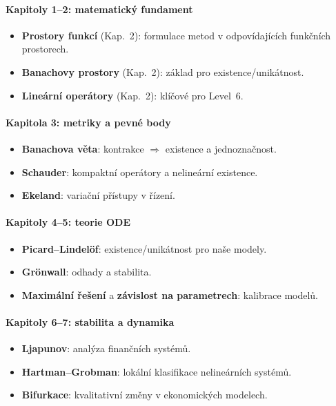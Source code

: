 \paragraph{Kapitoly 1--2: matematický fundament}
\begin{itemize}
  \item \textbf{Prostory funkcí} (Kap.~2): formulace metod v odpovídajících funkčních prostorech.
  \item \textbf{Banachovy prostory} (Kap.~2): základ pro existence/unikátnost.
  \item \textbf{Lineární operátory} (Kap.~2): klíčové pro Level~6.
\end{itemize}

\paragraph{Kapitola 3: metriky a pevné body}
\begin{itemize}
  \item \textbf{Banachova věta}: kontrakce $\Rightarrow$ existence a jednoznačnost.
  \item \textbf{Schauder}: kompaktní operátory a nelineární existence.
  \item \textbf{Ekeland}: variační přístupy v řízení.
\end{itemize}

\paragraph{Kapitoly 4--5: teorie ODE}
\begin{itemize}
  \item \textbf{Picard--Lindelöf}: existence/unikátnost pro naše modely.
  \item \textbf{Grönwall}: odhady a stabilita.
  \item \textbf{Maximální řešení} a \textbf{závislost na parametrech}: kalibrace modelů.
\end{itemize}

\paragraph{Kapitoly 6--7: stabilita a dynamika}
\begin{itemize}
  \item \textbf{Ljapunov}: analýza finančních systémů.
  \item \textbf{Hartman--Grobman}: lokální klasifikace nelineárních systémů.
  \item \textbf{Bifurkace}: kvalitativní změny v ekonomických modelech.
\end{itemize}


